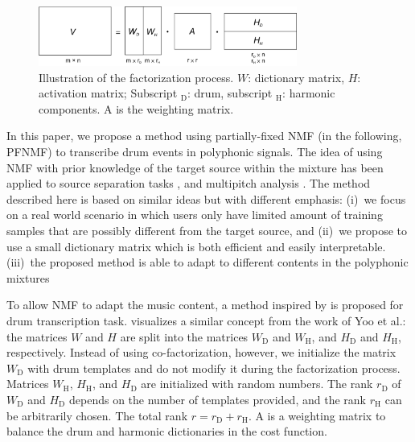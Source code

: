 \documentclass{article}
\begin{document}
\begin{figure}
 \centering 
  \centerline{
 \includegraphics[width=8.5cm]{factorization2.png}}
 \caption{Illustration of the factorization process. $W$: dictionary matrix, $H$: activation matrix; Subscript $_\mathrm{D}$: drum, subscript $_\mathrm{H}$: harmonic components. $\mathrm{A}$ is the weighting matrix. }
 \label{fig:factorization}
\end{figure}

In this paper, we propose a method using partially-fixed NMF (in the following, PFNMF) to transcribe drum events in polyphonic signals. The idea of using NMF with prior knowledge of the target source within the mixture has been applied to source separation tasks \cite{smaragdis_ssnmf_2007}, and multipitch analysis \cite{raczynski_Hnmf_2007}. The method described here is based on similar ideas but with different emphasis: 
(i)~we focus on a real world scenario in which users only have limited amount of training samples that are possibly different from the target source, and
(ii)~we propose to use a small dictionary matrix which is both efficient and easily interpretable.
(iii)~the proposed method is able to adapt to different contents in the polyphonic mixtures 

To allow NMF to adapt the music content, a method inspired by \cite{yoo_nonnegative_2010} is proposed for drum transcription task.  visualizes a similar concept from the work of Yoo et al.: the matrices $W$ and $H$ are split into the  matrices $W_\mathrm{D}$ and $W_\mathrm{H}$, and  $H_\mathrm{D}$ and $H_\mathrm{H}$, respectively. Instead of using co-factorization, however, we initialize the matrix $W_\mathrm{D}$ with drum templates and do not modify it during the factorization process. Matrices $W_\mathrm{H}$, $H_\mathrm{H}$, and $H_\mathrm{D}$ are initialized with random numbers. The rank $r_\mathrm{D}$ of $W_\mathrm{D}$ and $H_\mathrm{D}$ depends on the number of templates provided, and the rank $r_\mathrm{H}$ can be arbitrarily chosen. The total rank $r = r_\mathrm{D} + r_\mathrm{H}$. A is a weighting matrix to balance the drum and harmonic dictionaries in the cost function.
\end{document}
